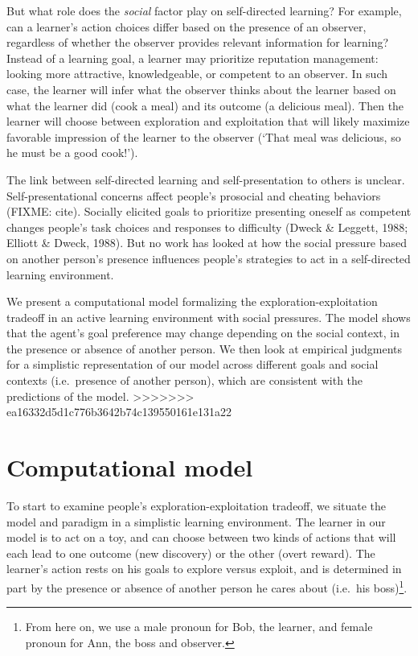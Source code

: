 \documentclass[10pt, letterpaper]{article}
\begin{document}
But what role does the \emph{social} factor play on self-directed
learning? For example, can a learner's action choices differ based on
the presence of an observer, regardless of whether the observer provides
relevant information for learning? Instead of a learning goal, a learner
may prioritize reputation management: looking more attractive,
knowledgeable, or competent to an observer. In such case, the learner
will infer what the observer thinks about the learner based on what the
learner did (cook a meal) and its outcome (a delicious meal). Then the
learner will choose between exploration and exploitation that will
likely maximize favorable impression of the learner to the observer
(`That meal was delicious, so he must be a good cook!').

The link between self-directed learning and self-presentation to others
is unclear. Self-presentational concerns affect people's prosocial and
cheating behaviors (FIXME: cite). Socially elicited goals to prioritize
presenting oneself as competent changes people's task choices and
responses to difficulty (Dweck \& Leggett, 1988; Elliott \& Dweck,
1988). But no work has looked at how the social pressure based on
another person's presence influences people's strategies to act in a
self-directed learning environment.

We present a computational model formalizing the
exploration-exploitation tradeoff in an active learning environment with
social pressures. The model shows that the agent's goal preference may
change depending on the social context, in the presence or absence of
another person. We then look at empirical judgments for a simplistic
representation of our model across different goals and social contexts
(i.e.~presence of another person), which are consistent with the
predictions of the model.
>>>>>>> ea16332d5d1c776b3642b74c139550161e131a22

\section{Computational model}\label{computational-model}

To start to examine people's exploration-exploitation tradeoff, we
situate the model and paradigm in a simplistic learning environment. The
learner in our model is to act on a toy, and can choose between two
kinds of actions that will each lead to one outcome (new discovery) or
the other (overt reward). The learner's action rests on his goals to
explore versus exploit, and is determined in part by the presence or
absence of another person he cares about (i.e.~his
boss)\footnote{From here on, we use a male pronoun for Bob, the learner, and female pronoun for Ann, the boss and observer.}.
\end{document}
